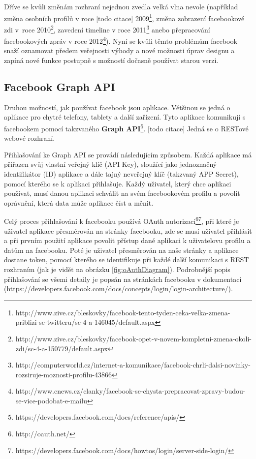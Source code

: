 \documentclass[thesis=M,czech]{FITthesis}[2013/05/10]
\begin{document}
Dříve se kvůli změnám rozhraní nejednou zvedla velká vlna nevole (například změna osobních profilů v roce [todo citace] 2009\footnote{http://www.zive.cz/bleskovky/facebook-tento-tyden-ceka-velka-zmena-priblizi-se-twitteru/sc-4-a-146045/default.aspx}, změna zobrazení facebookové zdi v~roce  2010\footnote{http://www.zive.cz/bleskovky/facebook-opet-v-novem-kompletni-zmena-okoli-zdi/sc-4-a-150779/default.aspx}, zavedení timeline v roce 2011\footnote{http://computerworld.cz/internet-a-komunikace/facebook-chrli-dalsi-novinky-rozsiruje-moznosti-profilu-43866} anebo přepracování facebookových zpráv v roce 2012\footnote{http://www.cnews.cz/clanky/facebook-se-chysta-prepracovat-zpravy-budou-se-vice-podobat-e-mailu}). Nyní se kvůli těmto problémům facebook snaží oznamovat předem veřejnosti výhody a nové možnosti úprav designu a zapíná nové funkce postupně s možností dočasně používat starou verzi.  

\subsection{Facebook Graph API}
Druhou možností, jak používat facebook jsou aplikace. Většinou se jedná o aplikace pro chytré telefony, tablety a další zařízení. Tyto aplikace komunikují s facebookem pomocí takzvaného \textbf{Graph API}\footnote{https://developers.facebook.com/docs/reference/apis/}. [todo citace] Jedná se o RESTové webové rozhraní.

Přihlašování ke Graph API se provádí následujícím způsobem. Každá aplikace má přiřazen svůj vlastní veřejný klíč (API Key), sloužící jako jednoznačný identifikátor (ID) aplikace a dále tajný neveřejný klíč (takzvaný APP Secret), pomocí kterého se k aplikaci přihlašuje. Každý uživatel, který chce aplikaci používat, musí danou aplikaci schválit na svém facebookovém profilu a povolit oprávnění, která data může aplikace číst a měnit.

Celý proces přihlašování k facebooku používá OAuth autorizaci\footnote{http://oauth.net/}\footnote{https://developers.facebook.com/docs/howtos/login/server-side-login/}, při které je uživatel aplikace přesměrován na stránky facebooku, zde se musí uživatel příhlásit a při prvním použití aplikace povolit přístup dané aplikaci k uživatelovu profilu a datům na facebooku. Poté je uživatel přesměrován na naše stránky a aplikace dostane token, pomocí kterého se identifikuje při každé další komunikaci s REST rozhraním  (jak je vidět na obrázku \ref{fig:oAuthDiagram}). Podrobnější popis příhlašování se všemi detaily je popsán na stránkách facebooku v dokumentaci \newline(https://developers.facebook.com/docs/concepts/login/login-architecture/). 
\end{document}
